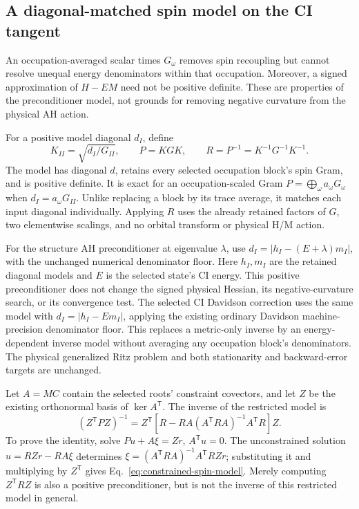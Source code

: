 \documentclass[11pt,a4paper]{article}
\newcommand{\Tr}{^{\mathsf T}}
\begin{document}
\subsection{A diagonal-matched spin model on the CI tangent}
\label{sec:spin-tangent-model}

An occupation-averaged scalar times $G_\omega$ removes spin recoupling
but cannot resolve unequal energy denominators within that occupation.
Moreover, a signed approximation of $H-EM$ need not be positive definite.
These are properties of the preconditioner model, not grounds for removing
negative curvature from the physical AH action.

For a positive model diagonal $d_I$, define
\begin{equation}
 K_{II}=\sqrt{d_I/G_{II}},\qquad P=KGK,\qquad
 R=P^{-1}=K^{-1}G^{-1}K^{-1}.
 \label{eq:diagonal-spin-model}
\end{equation}
The model has diagonal $d$, retains every selected occupation block's
spin Gram, and is positive definite. It is exact for an occupation-scaled
Gram $P=\bigoplus_\omega a_\omega G_\omega$ when
$d_I=a_\omega G_{II}$. Unlike replacing a block by its trace average,
it matches each input diagonal individually. Applying $R$ uses the
already retained factors of $G$, two elementwise scalings, and no orbital
transform or physical H/M action.

For the structure AH preconditioner at eigenvalue $\lambda$, use
$d_I=|h_I-(E+\lambda)m_I|$, with the unchanged numerical denominator floor.
Here $h_I,m_I$ are the retained diagonal models and $E$ is the selected
state's CI energy. This positive preconditioner does not change the signed
physical Hessian, its negative-curvature search, or its convergence test.
The selected CI Davidson correction uses the same model with
$d_I=|h_I-E m_I|$, applying the existing ordinary Davidson
machine-precision denominator floor. This replaces a metric-only inverse
by an energy-dependent inverse model without averaging any occupation
block's denominators. The physical generalized Ritz problem and both
stationarity and backward-error targets are unchanged.

Let $A=M C$ contain the selected roots' constraint covectors, and let
$Z$ be the existing orthonormal basis of $\ker A\Tr$. The inverse of the
restricted model is
\begin{equation}
 (Z\Tr PZ)^{-1}
 =Z\Tr\left[R-RA(A\Tr RA)^{-1}A\Tr R\right]Z.
 \label{eq:constrained-spin-model}
\end{equation}
To prove the identity, solve $Pu+A\xi=Zr$, $A\Tr u=0$.
The unconstrained solution $u=RZr-RA\xi$ determines
$\xi=(A\Tr RA)^{-1}A\Tr RZr$; substituting it and multiplying by
$Z\Tr$ gives Eq.~\eqref{eq:constrained-spin-model}. Merely computing
$Z\Tr RZ$ is also a positive preconditioner, but is not the inverse of
this restricted model in general.
\end{document}
